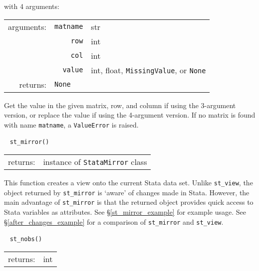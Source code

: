 \documentclass{article}
\begin{document}
			\vspace{1.5mm}
			\indent with 4 arguments:
			
			\indent \qquad \begin{tabular}{rrl}
					arguments: & \texttt{matname} & str \\
						& \texttt{row} & int \\
						& \texttt{col} & int \\
						& \texttt{value} & int, float, \lstinline$MissingValue$, or \texttt{None} \\
					returns: & \multicolumn{2}{l}{\texttt{None}}
				\end{tabular}
				
			\vspace{1.5mm}
			\noindent Get the value in the given matrix, row, and column if using the 3-argument version, or replace the value if using the 4-argument version. If no matrix is found with name \lstinline{matname}, a \lstinline{ValueError} is raised. \newline
			
						
			\ \newline
			\noindent \lstinline$st_mirror()$
								
			\vspace{1.5mm}
			\noindent 
			\indent \begin{tabular}{rrl}
					returns: & \multicolumn{2}{l}{instance of \lstinline$StataMirror$ class}
				\end{tabular}
								
			\vspace{1.5mm}
			\noindent This function creates a view onto the current Stata data set. Unlike \lstinline{st_view}, the object returned by \lstinline{st_mirror} is `aware' of changes made in Stata. However, the main advantage of \lstinline{st_mirror} is that the returned object provides quick access to Stata variables as attributes. See \S\ref{st_mirror_example} for example usage. See \S\ref{after_changes_example} for a comparison of \lstinline{st_mirror} and \lstinline{st_view}. \newline
			
			
			\ \newline
			\noindent \lstinline$st_nobs()$
			
			\vspace{1.5mm}
			\noindent 
			\indent \begin{tabular}{rl}
					returns: & int
				\end{tabular}
								
\end{document}

